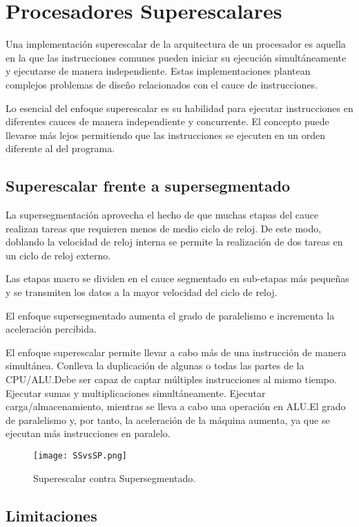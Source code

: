 \section{Procesadores Superescalares}\label{sec:superscalar}

Una implementación superescalar de la arquitectura de un procesador es aquella en la que las instrucciones comunes pueden iniciar su ejecución simultáneamente y ejecutarse de manera independiente. Estas implementaciones plantean complejos problemas de diseño relacionados con el cauce de instrucciones.

Lo esencial del enfoque superescalar es su habilidad para ejecutar instrucciones en diferentes cauces de manera independiente y concurrente. El concepto puede llevarse más lejos permitiendo que las instrucciones se ejecuten en un orden diferente al del programa.

\subsection{Superescalar frente a supersegmentado}

La supersegmentación aprovecha el hecho de que muchas etapas del cauce realizan tareas que requieren menos de medio ciclo de reloj. De este modo, doblando la velocidad de reloj interna se permite la realización de dos tareas en un ciclo de reloj externo.

Las etapas macro se dividen en el cauce segmentado en sub-etapas más pequeñas y se transmiten los datos a la mayor velocidad del ciclo de reloj.

El enfoque supersegmentado aumenta el grado de paralelismo e incrementa la aceleración percibida.

El enfoque superescalar permite llevar a cabo más de una instrucción de manera simultánea. Conlleva la duplicación de algunas o todas las partes de la CPU/ALU.\@ Debe ser capaz de captar múltiples instrucciones al mismo tiempo. Ejecutar sumas y multiplicaciones simultáneamente. Ejecutar carga/almacenamiento, mientras se lleva a cabo una operación en ALU.\@ El grado de paralelismo y, por tanto, la aceleración de la máquina aumenta, ya que se ejecutan más instrucciones en paralelo.

\begin{figure}[H]
  \centering
  \texttt{[image: SSvsSP.png]}
  \caption{Superescalar contra Supersegmentado.}
\end{figure}

\subsection*{Limitaciones}

